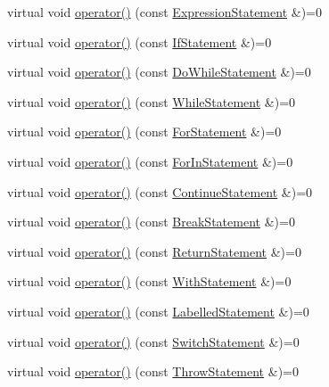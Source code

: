 \begin{DoxyCompactItemize}
\item 
virtual void \hyperlink{struct_visitor_a319554fbb3f24e664a86ef7839201040}{operator()} (const \hyperlink{struct_expression_statement}{Expression\+Statement} \&)=0
\item 
virtual void \hyperlink{struct_visitor_a9d30bc5ad73a274f7533df4b5a65ae41}{operator()} (const \hyperlink{struct_if_statement}{If\+Statement} \&)=0
\item 
virtual void \hyperlink{struct_visitor_a077a0025430c4b35d310bdfcbe1b180a}{operator()} (const \hyperlink{struct_do_while_statement}{Do\+While\+Statement} \&)=0
\item 
virtual void \hyperlink{struct_visitor_a4faef50c61a3c1246589390d925c2f53}{operator()} (const \hyperlink{struct_while_statement}{While\+Statement} \&)=0
\item 
virtual void \hyperlink{struct_visitor_a75180858faf5152f99742e4a19757928}{operator()} (const \hyperlink{struct_for_statement}{For\+Statement} \&)=0
\item 
virtual void \hyperlink{struct_visitor_af1c6c55ccfae8b2741e12168d81c45cb}{operator()} (const \hyperlink{struct_for_in_statement}{For\+In\+Statement} \&)=0
\item 
virtual void \hyperlink{struct_visitor_aca30136319d28baf708663a1d823af3a}{operator()} (const \hyperlink{struct_continue_statement}{Continue\+Statement} \&)=0
\item 
virtual void \hyperlink{struct_visitor_a19997436906171d41bec562d9cf260ef}{operator()} (const \hyperlink{struct_break_statement}{Break\+Statement} \&)=0
\item 
virtual void \hyperlink{struct_visitor_a041431785a00f9f387c7bc670b3ac660}{operator()} (const \hyperlink{struct_return_statement}{Return\+Statement} \&)=0
\item 
virtual void \hyperlink{struct_visitor_a16b17bbc1c01ed7ce1a0153b5c4c43a6}{operator()} (const \hyperlink{struct_with_statement}{With\+Statement} \&)=0
\item 
virtual void \hyperlink{struct_visitor_aea8fafb476b979172cc8a76ae511caff}{operator()} (const \hyperlink{struct_labelled_statement}{Labelled\+Statement} \&)=0
\item 
virtual void \hyperlink{struct_visitor_aadc852469aa4f7da11cc9f88084c63a8}{operator()} (const \hyperlink{struct_switch_statement}{Switch\+Statement} \&)=0
\item 
virtual void \hyperlink{struct_visitor_a806a67e34e7866e3af078b3c2b421a24}{operator()} (const \hyperlink{struct_throw_statement}{Throw\+Statement} \&)=0

\end{DoxyCompactItemize}
